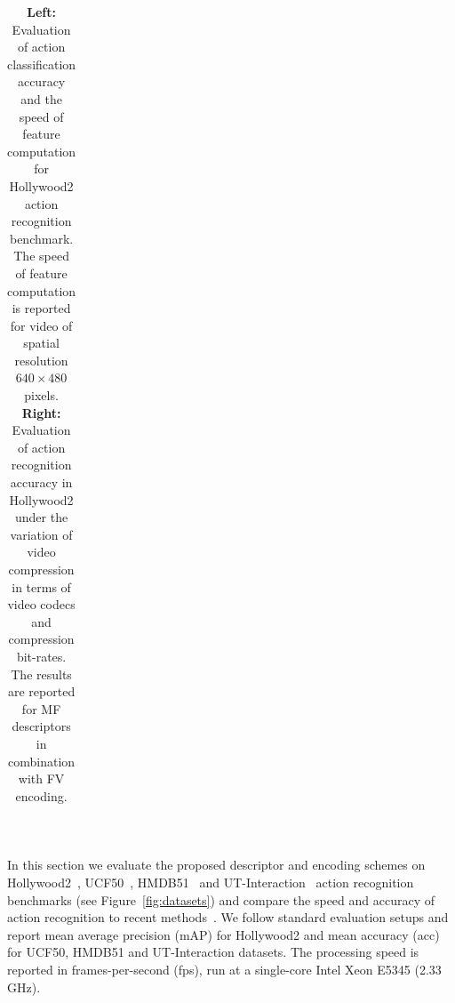 \documentclass[10pt,twocolumn,letterpaper]{article}
\begin{document}
\begin{table}[t!]
\begin{center}
\begin{tabular}{p{}p{}}
\end{tabular}
\mbox{}\vspace{.1cm}\\
\caption{{\bf Left:} Evaluation of action classification accuracy and the speed of feature computation for Hollywood2 action recognition benchmark. The speed of feature computation is reported for video of spatial resolution $640\times480$ pixels. {\bf Right:} Evaluation of action recognition accuracy in Hollywood2 under the variation of video compression in terms of video codecs and compression bit-rates. The results are reported for MF descriptors in combination with FV encoding.\vspace{-.2cm}}
\label{tab:HWD2}
\end{center}
\end{table}


In this section we evaluate the proposed descriptor and encoding schemes on Hollywood2~\cite{Marszalek09}, UCF50~\cite{Reddy12}, HMDB51~\cite{Kuehne11} and UT-Interaction~\cite{Ryoo10} action recognition benchmarks (see Figure~\ref{fig:datasets}) and compare the speed and accuracy of action recognition to recent methods~\cite{Feng13,Wang12,Yu10}. We follow standard evaluation setups and report mean average precision (mAP) for Hollywood2 and mean accuracy (acc) for UCF50, HMDB51 and UT-Interaction datasets. The processing speed is reported in frames-per-second (fps), run at a single-core Intel Xeon E5345 (2.33 GHz).
\end{document}
